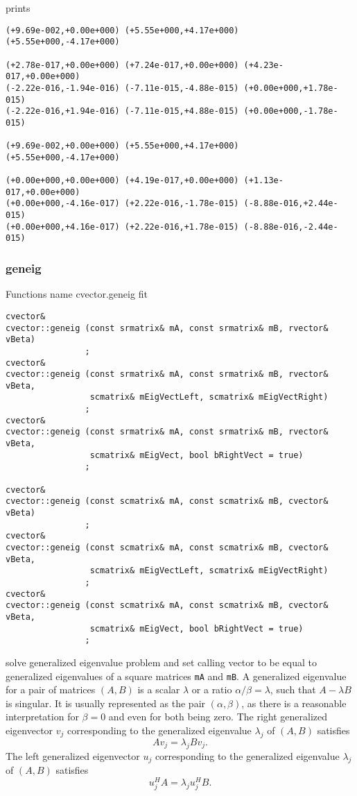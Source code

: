 prints
\begin{Verbatim}
(+9.69e-002,+0.00e+000) (+5.55e+000,+4.17e+000) (+5.55e+000,-4.17e+000)

(+2.78e-017,+0.00e+000) (+7.24e-017,+0.00e+000) (+4.23e-017,+0.00e+000)
(-2.22e-016,-1.94e-016) (-7.11e-015,-4.88e-015) (+0.00e+000,+1.78e-015)
(-2.22e-016,+1.94e-016) (-7.11e-015,+4.88e-015) (+0.00e+000,-1.78e-015)

(+9.69e-002,+0.00e+000) (+5.55e+000,+4.17e+000) (+5.55e+000,-4.17e+000)

(+0.00e+000,+0.00e+000) (+4.19e-017,+0.00e+000) (+1.13e-017,+0.00e+000)
(+0.00e+000,-4.16e-017) (+2.22e-016,-1.78e-015) (-8.88e-016,+2.44e-015)
(+0.00e+000,+4.16e-017) (+2.22e-016,+1.78e-015) (-8.88e-016,-2.44e-015)
\end{Verbatim}
\newpage


\subsubsection{geneig}
Functions%
\pdfdest name {cvector.geneig} fit
\begin{verbatim}
cvector& 
cvector::geneig (const srmatrix& mA, const srmatrix& mB, rvector& vBeta)
                ;
cvector& 
cvector::geneig (const srmatrix& mA, const srmatrix& mB, rvector& vBeta,
                 scmatrix& mEigVectLeft, scmatrix& mEigVectRight) 
                ;
cvector& 
cvector::geneig (const srmatrix& mA, const srmatrix& mB, rvector& vBeta,
                 scmatrix& mEigVect, bool bRightVect = true)
                ;

cvector& 
cvector::geneig (const scmatrix& mA, const scmatrix& mB, cvector& vBeta)
                ;
cvector& 
cvector::geneig (const scmatrix& mA, const scmatrix& mB, cvector& vBeta,
                 scmatrix& mEigVectLeft, scmatrix& mEigVectRight)
                ;
cvector& 
cvector::geneig (const scmatrix& mA, const scmatrix& mB, cvector& vBeta,
                 scmatrix& mEigVect, bool bRightVect = true)
                ;
\end{verbatim}
solve generalized eigenvalue problem and
set  calling vector to be equal to generalized eigenvalues
of a square matrices \verb"mA" and  \verb"mB".
A generalized eigenvalue for a pair of matrices $(A,B)$ is a scalar $\lambda$ or a ratio $\alpha / \beta = \lambda$, 
such that $A - \lambda B$ is singular. It is usually represented as the pair $(\alpha, \beta)$, 
as there is a reasonable interpretation for $\beta =0$ and even for both being zero.
The right generalized eigenvector $v_j$ corresponding to the generalized eigenvalue $\lambda_j$ of $(A,B)$ satisfies
\begin{equation*}
A v_j = \lambda_j B v_j.
\end{equation*}
The left generalized eigenvector $u_j$ corresponding to the generalized eigenvalue $\lambda_j$ of $(A,B)$ satisfies
\begin{equation*}
u_j^H A = \lambda_j u_j^H B.
\end{equation*}

